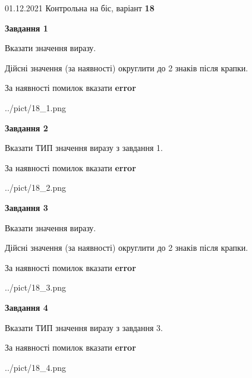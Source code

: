 \documentclass[11pt, ukrainian]{article}
\begin{document}
{01.12.2021 Контрольна на біс, варіант  \No \textbf { 18 }\par}
{
\begin {large}
{\begin {center}\textbf{Завдання 1}\end {center}}\par
Вказати значення виразу. \par
Дійсні значення (за наявності) округлити до 2 знаків після крапки. \par
За наявності помилок вказати \textbf{error}

\begin{center}
	{../pict/18_1.png}
\end{center}
\newpage

{\begin {center}\textbf{Завдання 2}\end {center}}\par
Вказати ТИП значення виразу з завдання 1. \par
За наявності помилок вказати \textbf{error}

\begin{center}
	{../pict/18_2.png}
\end{center}
\newpage

{\begin {center}\textbf{Завдання 3}\end {center}}\par
Вказати значення виразу. \par
Дійсні значення (за наявності) округлити до 2 знаків після крапки. \par
За наявності помилок вказати \textbf{error}

\begin{center}
	{../pict/18_3.png}
\end{center}
\newpage

{\begin {center}\textbf{Завдання 4}\end {center}}\par
Вказати ТИП значення виразу з завдання 3. \par
За наявності помилок вказати \textbf{error}

\begin{center}
	{../pict/18_4.png}
\end{center}
\newpage


\end{large}}
\end{document}
